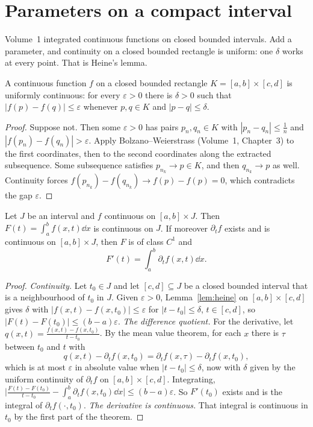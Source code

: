 \section{Parameters on a compact interval}

Volume~1 integrated continuous functions on closed bounded intervals. Add a parameter, and continuity on a closed bounded rectangle is uniform: one $\delta$ works at every point. That is Heine's lemma.

\begin{lemma}[Heine]\label{lem:heine}
A continuous function $f$ on a closed bounded rectangle $K=[a,b]\times[c,d]$ is uniformly continuous: for every
$\varepsilon>0$ there is $\delta>0$ such that $|f(p)-f(q)|\le\varepsilon$ whenever $p,q\in K$ and $|p-q|\le\delta$.
\end{lemma}
\begin{proof}
Suppose not. Then some $\varepsilon>0$ has pairs $p_n,q_n\in K$ with $|p_n-q_n|\le\frac1n$ and $|f(p_n)-f(q_n)|>\varepsilon$. Apply
Bolzano--Weierstrass (Volume~1, Chapter~3) to the first coordinates, then to the second coordinates along the extracted
subsequence. Some subsequence satisfies $p_{n_k}\to p\in K$, and then $q_{n_k}\to p$ as well. Continuity forces
$f(p_{n_k})-f(q_{n_k})\to f(p)-f(p)=0$, which contradicts the gap $\varepsilon$.
\end{proof}

\begin{theorem}\label{thm:paramcompact}
Let $J$ be an interval and $f$ continuous on $[a,b]\times J$. Then $F(t)=\int_a^bf(x,t)\dd x$ is continuous on $J$. If
moreover $\partial_tf$ exists and is continuous on $[a,b]\times J$, then $F$ is of class $C^1$ and
\[
F'(t)=\int_a^b\partial_tf(x,t)\dd x.
\]
\end{theorem}
\begin{proof}
\emph{Continuity.}
Let $t_0\in J$ and let $[c,d]\subseteq J$ be a closed bounded interval that is a neighbourhood of $t_0$ in $J$. Given $\varepsilon>0$,
Lemma~\ref{lem:heine} on $[a,b]\times[c,d]$ gives $\delta$ with $|f(x,t)-f(x,t_0)|\le\varepsilon$ for $|t-t_0|\le\delta$, $t\in[c,d]$, so
$|F(t)-F(t_0)|\le(b-a)\varepsilon$.
\emph{The difference quotient.}
For the derivative, let $q(x,t)=\frac{f(x,t)-f(x,t_0)}{t-t_0}$. By the mean value theorem, for each $x$
there is $\tau$ between $t_0$ and $t$ with
\[
q(x,t)-\partial_tf(x,t_0)=\partial_tf(x,\tau)-\partial_tf(x,t_0),
\]
which is at most $\varepsilon$ in absolute value when $|t-t_0|\le\delta$, now with $\delta$ given by the uniform continuity of $\partial_tf$
on $[a,b]\times[c,d]$. Integrating, $\bigl|\frac{F(t)-F(t_0)}{t-t_0}-\int_a^b\partial_tf(x,t_0)\dd x\bigr|\le(b-a)\varepsilon$. So $F'(t_0)$ exists and is the
integral of $\partial_tf(\cdot,t_0)$.
\emph{The derivative is continuous.}
That integral is continuous in $t_0$ by the first part of the theorem.
\end{proof}

